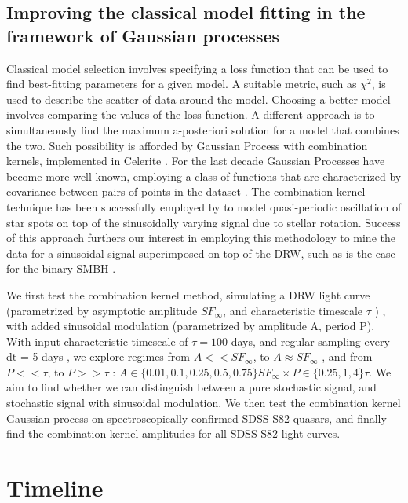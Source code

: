 \documentclass[modern]{aastex62}
\begin{document}
\subsection{Improving the classical model fitting in the  framework of Gaussian processes}

Classical model selection involves specifying a loss function that can be used to find best-fitting parameters for a given model. A suitable metric, such as $\chi^{2}$, is used to  describe the scatter of data around the model. Choosing a better model involves comparing the values of the loss function. A different approach is to simultaneously find the maximum a-posteriori solution for a model that combines the two. Such possibility is afforded by Gaussian Process with combination kernels,  implemented in Celerite  \citep{foreman2017}. For the last decade Gaussian Processes have become more well known, employing a class of functions that  are characterized by covariance between pairs of points in the dataset \citep{foreman2017}.  The combination kernel technique has been successfully employed by  \cite{angus2018}  to model  quasi-periodic oscillation of star spots on top of the sinusoidally varying signal due to stellar rotation. Success of this approach furthers our interest in employing this methodology to mine the data for a sinusoidal signal superimposed on top of the DRW, such as is the case for the binary SMBH \citep{charisi2018}. 

We first test the combination kernel method, simulating a DRW light curve (parametrized by asymptotic amplitude $SF_{\infty}$, and characteristic timescale $\tau$ ) , with  added sinusoidal modulation (parametrized by amplitude A, period P). With input characteristic timescale of $\tau  = 100 $ days, and regular sampling every dt = 5 days  , we explore regimes from $A << SF_{\infty}$,  to $A \approx SF_{\infty}$ , and from $P << \tau$, to $P >> \tau$ :  $A \in \{ 0.01,  0.1,  0.25,  0.5, 0.75 \} SF_{\infty}  \times  P \in \{ 0.25,  1 ,  4 \} \tau  $. We aim to find whether we can distinguish between a pure stochastic signal, and stochastic signal with sinusoidal modulation. We then test the combination kernel Gaussian process on spectroscopically confirmed SDSS S82 quasars, and finally find  the combination kernel amplitudes for all SDSS S82 light curves.


\section{Timeline}




\end{document}
